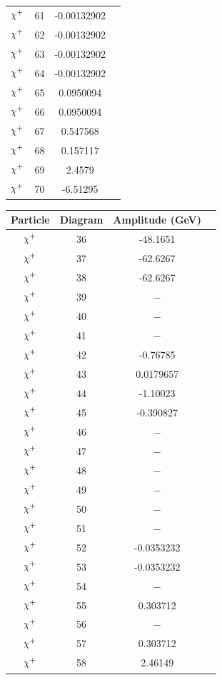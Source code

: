 \documentclass[11pt]{article}
\newcommand{\mychibig}{\raisebox{0pt}[1ex][1ex]{$\chi$}}
\begin{document}
\begin{table}[h!]
\begin{tabular}{c c c c}
$\mychibig^+$ & 61 & -0.00132902 \\ 
$\mychibig^+$ & 62 & -0.00132902 \\ 
$\mychibig^+$ & 63 & -0.00132902 \\ 
$\mychibig^+$ & 64 & -0.00132902 \\ 
$\mychibig^+$ & 65 & 0.0950094 \\ 
$\mychibig^+$ & 66 & 0.0950094 \\ 
$\mychibig^+$ & 67 & 0.547568 \\ 
$\mychibig^+$ & 68 & 0.157117 \\ 
$\mychibig^+$ & 69 & 2.4579 \\ 
$\mychibig^+$ & 70 & -6.51295 \\ 
\hline\end{tabular}
\begin{tabular}{c c c c}
Particle & Diagram & Amplitude (GeV) \\
\hline
$\mychibig^+$ & 36 & -48.1651 \\ 
$\mychibig^+$ & 37 & -62.6267 \\ 
$\mychibig^+$ & 38 & -62.6267 \\ 
$\mychibig^+$ & 39 & $-$ \\ 
$\mychibig^+$ & 40 & $-$ \\ 
$\mychibig^+$ & 41 & $-$ \\ 
$\mychibig^+$ & 42 & -0.76785 \\ 
$\mychibig^+$ & 43 & 0.0179657 \\ 
$\mychibig^+$ & 44 & -1.10023 \\ 
$\mychibig^+$ & 45 & -0.390827 \\ 
$\mychibig^+$ & 46 & $-$ \\ 
$\mychibig^+$ & 47 & $-$ \\ 
$\mychibig^+$ & 48 & $-$ \\ 
$\mychibig^+$ & 49 & $-$ \\ 
$\mychibig^+$ & 50 & $-$ \\ 
$\mychibig^+$ & 51 & $-$ \\ 
$\mychibig^+$ & 52 & -0.0353232 \\ 
$\mychibig^+$ & 53 & -0.0353232 \\ 
$\mychibig^+$ & 54 & $-$ \\ 
$\mychibig^+$ & 55 & 0.303712 \\ 
$\mychibig^+$ & 56 & $-$ \\ 
$\mychibig^+$ & 57 & 0.303712 \\ 
$\mychibig^+$ & 58 & 2.46149 \\ 

\end{tabular}
\end{table}
\end{document}
